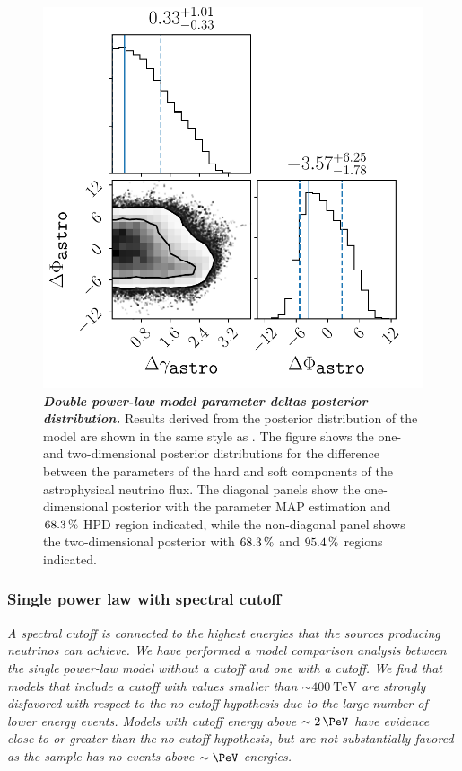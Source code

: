 \begin{figure}
	\centering
	\includegraphics[width=\linewidth]{figures/hese_paper/dpl_flat_delta_vars}
	\internallinenumbers
	\caption{\textbf{\textit{Double power-law model parameter deltas posterior distribution.}}
		Results derived from the posterior distribution of the model are shown in the same style as .
		The figure shows the one- and two-dimensional posterior distributions for the difference between the parameters of the hard and soft components of the astrophysical neutrino flux.
		The diagonal panels show the one-dimensional posterior with the parameter MAP estimation and $\SI{68.3}\percent$ HPD region indicated, while the non-diagonal panel shows the two-dimensional posterior with $\SI{68.3}\percent$ and $\SI{95.4}\percent$ regions indicated.}\label{fig:dpl_delta_posterior}
\end{figure}

\subsubsection{Single power law with spectral cutoff\label{sec:cutoff}}

\noindent
\textit{%
	A spectral cutoff is connected to the highest energies that the sources producing neutrinos can achieve.
	We have performed a model comparison analysis between the single power-law model without a cutoff and one with a cutoff.
	We find that models that include a cutoff with values smaller than $\sim\SI{400}\TeV$ are strongly disfavored with respect to the no-cutoff hypothesis due to the  large number of lower energy events.
	Models with cutoff energy above $\sim\SI{2}\PeV$ have evidence close to or greater than the no-cutoff hypothesis, but are not substantially favored as the sample has no events above $\sim\si\PeV$ energies.
}
\newline

